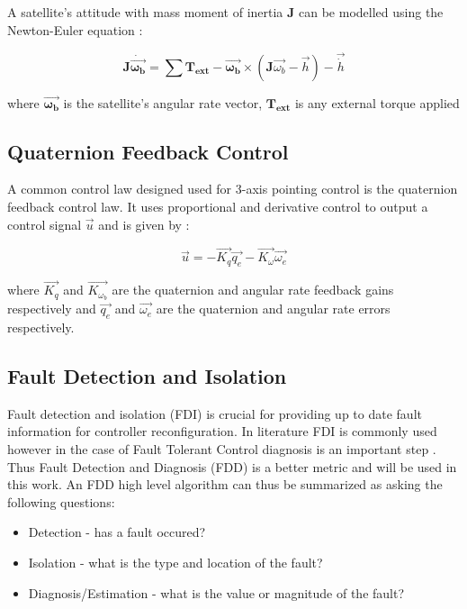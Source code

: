 A satellite's attitude with mass moment of inertia $\boldsymbol{J}$ can be modelled using the Newton-Euler equation \cite{sidiAttitudeDynamicsKinematics1997}: 

$$
\mathbf{J}\mathbf{\dot{\vec{\omega_{b}}}} = \sum{\mathbf{T_{ext}}} -\mathbf{\vec{\omega_{b}}}\times(\mathbf{J}\vec{\omega_{b}}-\vec{h})-\vec{\dot{h}}
$$

where $\boldsymbol{\vec{\omega_{b}}}$ is the satellite's angular rate vector, $\boldsymbol{T_{ext}}$ is any external torque applied

\subsection{Quaternion Feedback Control}
A common control law designed used for 3-axis pointing control is the quaternion feedback control law. It uses proportional and derivative control to output a control signal $\vec{u}$ and is given by \cite{wieSpaceVehicleDynamics1998}:

\begin{equation}
    \vec{u} = -\vec{K_{q}}\vec{q_{e}} - \vec{K_{\omega}}\vec{\omega_{e}}
\end{equation}

where $\vec{K_{q}}$ and $\vec{K_{\omega_{b}}}$ are the quaternion and angular rate feedback gains respectively and $\vec{q_{e}}$ and $\vec{\omega_{e}}$ 
are the quaternion and angular rate errors respectively.

\subsection{Fault Detection and Isolation}
Fault detection and isolation (FDI) is crucial for providing up to date fault information for controller reconfiguration. In literature FDI is commonly used however in the case of Fault Tolerant Control diagnosis is an important step \cite{yinReviewRecentDevelopment2016}. Thus Fault Detection and Diagnosis (FDD) is a better metric and will be used in this work. An FDD high level algorithm can thus be summarized as asking the following questions:
\begin{itemize}
    \item Detection - has a fault occured?
    \item Isolation - what is the type and location of the fault?
    \item Diagnosis/Estimation - what is the value or magnitude of the fault?
\end{itemize}

